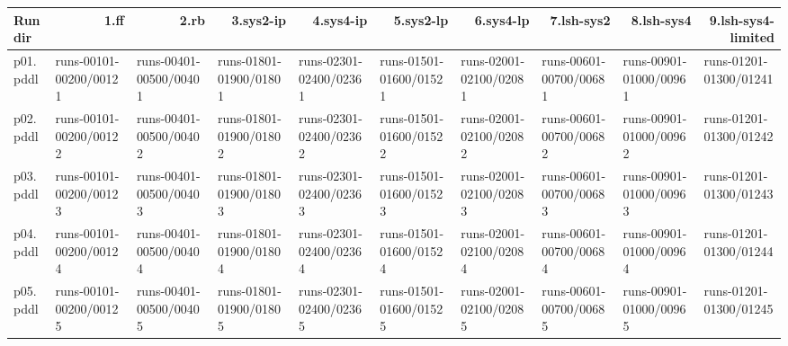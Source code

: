 \documentclass{article}
\begin{document}
\begin{tabular}{@{}lrrrrrrrrr@{}}
Run dir & 1.ff & 2.rb & 3.sys2-ip & 4.sys4-ip & 5.sys2-lp & 6.sys4-lp & 7.lsh-sys2 & 8.lsh-sys4 & 9.lsh-sys4-limited \\
\midrule
p01.pddl & \multicolumn{1}{|l|}{runs-00101-00200/00121} & \multicolumn{1}{|l|}{runs-00401-00500/00401} & \multicolumn{1}{|l|}{runs-01801-01900/01801} & \multicolumn{1}{|l|}{runs-02301-02400/02361} & \multicolumn{1}{|l|}{runs-01501-01600/01521} & \multicolumn{1}{|l|}{runs-02001-02100/02081} & \multicolumn{1}{|l|}{runs-00601-00700/00681} & \multicolumn{1}{|l|}{runs-00901-01000/00961} & \multicolumn{1}{|l|}{runs-01201-01300/01241} \\
p02.pddl & \multicolumn{1}{|l|}{runs-00101-00200/00122} & \multicolumn{1}{|l|}{runs-00401-00500/00402} & \multicolumn{1}{|l|}{runs-01801-01900/01802} & \multicolumn{1}{|l|}{runs-02301-02400/02362} & \multicolumn{1}{|l|}{runs-01501-01600/01522} & \multicolumn{1}{|l|}{runs-02001-02100/02082} & \multicolumn{1}{|l|}{runs-00601-00700/00682} & \multicolumn{1}{|l|}{runs-00901-01000/00962} & \multicolumn{1}{|l|}{runs-01201-01300/01242} \\
p03.pddl & \multicolumn{1}{|l|}{runs-00101-00200/00123} & \multicolumn{1}{|l|}{runs-00401-00500/00403} & \multicolumn{1}{|l|}{runs-01801-01900/01803} & \multicolumn{1}{|l|}{runs-02301-02400/02363} & \multicolumn{1}{|l|}{runs-01501-01600/01523} & \multicolumn{1}{|l|}{runs-02001-02100/02083} & \multicolumn{1}{|l|}{runs-00601-00700/00683} & \multicolumn{1}{|l|}{runs-00901-01000/00963} & \multicolumn{1}{|l|}{runs-01201-01300/01243} \\
p04.pddl & \multicolumn{1}{|l|}{runs-00101-00200/00124} & \multicolumn{1}{|l|}{runs-00401-00500/00404} & \multicolumn{1}{|l|}{runs-01801-01900/01804} & \multicolumn{1}{|l|}{runs-02301-02400/02364} & \multicolumn{1}{|l|}{runs-01501-01600/01524} & \multicolumn{1}{|l|}{runs-02001-02100/02084} & \multicolumn{1}{|l|}{runs-00601-00700/00684} & \multicolumn{1}{|l|}{runs-00901-01000/00964} & \multicolumn{1}{|l|}{runs-01201-01300/01244} \\
p05.pddl & \multicolumn{1}{|l|}{runs-00101-00200/00125} & \multicolumn{1}{|l|}{runs-00401-00500/00405} & \multicolumn{1}{|l|}{runs-01801-01900/01805} & \multicolumn{1}{|l|}{runs-02301-02400/02365} & \multicolumn{1}{|l|}{runs-01501-01600/01525} & \multicolumn{1}{|l|}{runs-02001-02100/02085} & \multicolumn{1}{|l|}{runs-00601-00700/00685} & \multicolumn{1}{|l|}{runs-00901-01000/00965} & \multicolumn{1}{|l|}{runs-01201-01300/01245} \\

\end{tabular}
\end{document}
